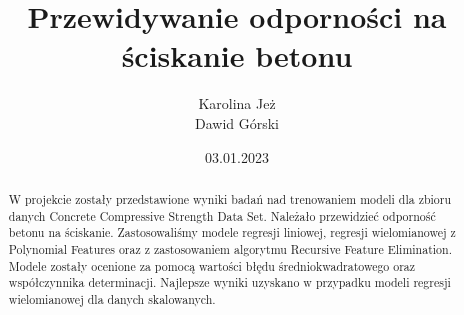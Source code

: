 \documentclass[11pt, a4paper, notitlepage]{report}
\author{Karolina Jeż \\Dawid Górski}
\title{\textbf{Przewidywanie odporności na ściskanie betonu}}
\date{03.01.2023}
\begin{document}
\clearpage\maketitle
\thispagestyle{empty}
\begin{abstract}
	W projekcie zostały przedstawione wyniki badań nad trenowaniem modeli dla zbioru danych Concrete Compressive Strength Data Set. Należało przewidzieć odporność betonu na ściskanie.
	Zastosowaliśmy modele regresji liniowej, regresji wielomianowej z Polynomial Features oraz z zastosowaniem algorytmu Recursive Feature Elimination.
	Modele zostały ocenione za pomocą wartości błędu średniokwadratowego oraz współczynnika determinacji. Najlepsze wyniki uzyskano w przypadku modeli regresji wielomianowej dla danych skalowanych.
\end{abstract}

\clearpage \tableofcontents
\thispagestyle{empty}

\setcounter{page}{1}
\end{document}
